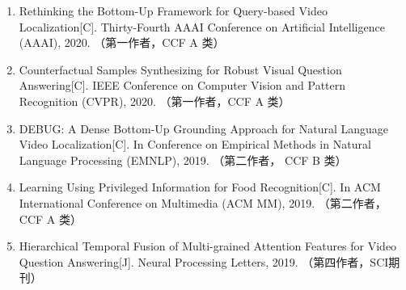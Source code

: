 \begin{publications}
\begin{enumerate}
\item{
Rethinking the Bottom-Up Framework for Query-based Video Localization[C].
Thirty-Fourth AAAI Conference on Artificial Intelligence (AAAI), 2020.
（第一作者，CCF A 类）
}

\item{
Counterfactual Samples Synthesizing for Robust Visual Question Answering[C].
IEEE Conference on Computer Vision and Pattern Recognition (CVPR), 2020.
（第一作者，CCF A 类）
}

\item{
DEBUG: A Dense Bottom-Up Grounding Approach for Natural Language Video Localization[C].
In Conference on Empirical Methods in Natural Language Processing (EMNLP), 2019.
（第二作者， CCF B 类）
}

\item{
Learning Using Privileged Information for Food Recognition[C].
In ACM International Conference on Multimedia (ACM MM), 2019.
（第二作者，CCF A 类）
}

\item{
Hierarchical Temporal Fusion of Multi-grained Attention Features for Video Question Answering[J]. 
Neural Processing Letters, 2019. 
（第四作者，SCI期刊）
} 
\end{enumerate}


\end{publications}
